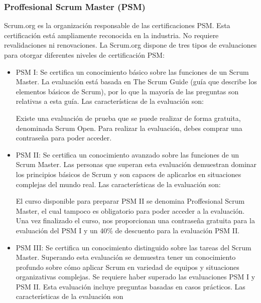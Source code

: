 \subsubsection{Proffesional Scrum Master (PSM)}
Scrum.org es la organización responsable de las certificaciones PSM. Esta certificación está ampliamente reconocida en la industria. No requiere revalidaciones ni renovaciones. La Scrum.org dispone de tres tipos de evaluaciones para otorgar diferentes niveles de certificación PSM: 

\begin{itemize}

\item{PSM I: Se certifica un conocimiento básico sobre las funciones de un Scrum Master. La evaluación está basada en The Scrum Guide\cite{PSF02} (guía que describe los elementos básicos de Scrum), por lo que la mayoría de las preguntas son relativas a esta guía. Las características de la evaluación son:}
	

Existe una evaluación de prueba que se puede realizar de forma gratuita, denominada Scrum Open.
Para realizar la evaluación, debes comprar una contraseña para poder acceder.

\item PSM II: Se certifica un conocimiento avanzado sobre las funciones de un Scrum Master. Las personas que superan esta evaluación demuestran dominar los principios básicos de Scrum y son capaces de aplicarlos en situaciones complejas del mundo real.  Las características de la evaluación son:


El curso disponible para preparar PSM II se denomina 	Proffesional Scrum Master, el cual tampoco es obligatorio para poder acceder a la evaluación. Una vez finalizado el curso, nos proporcionan una contraseña gratuita para la evaluación del PSM I y un 40\% de descuento para la evaluación PSM II.

\item PSM III: Se certifica un conocimiento distinguido sobre las tareas del Scrum Master. Superando esta evaluación se demuestra tener un conocimiento profundo sobre cómo aplicar Scrum en variedad de equipos y situaciones organizativas complejas. Se requiere haber superado las evaluaciones PSM I y PSM II. Esta evaluación incluye preguntas basadas en casos prácticos. Las características de la evaluación son


\end{itemize}



